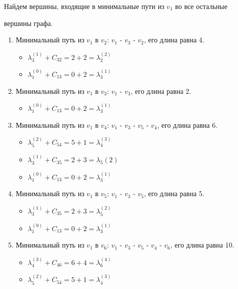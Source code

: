 \documentclass{article}
\begin{document}
\hspace{2mm}
Найдем вершины, входящие в минимальные пути из $v_1$ во все остальные
\par
\hspace{4mm}вершины графа.
\begin{enumerate} 
	\setlength{\itemindent}{6mm}
	\item Минимальный путь из $v_1$ в $v_2$: $v_1$ - $v_3$ - $v_2$, его длина равна 4.
	\begin{itemize} 
		\setlength{\itemindent}{6mm}
		\item $\lambda_3^{(1)} + C_{32} = 2 + 2 = \lambda_2^{(2)}$
        \item $\lambda_1^{(0)} + C_{13} = 0 + 2 = \lambda_3^{(1)}$
	\end{itemize} 
	\item Минимальный путь из $v_1$ в $v_3$: $v_1$ - $v_3$, его длина равна 2.
	\begin{itemize} 
		\setlength{\itemindent}{6mm}
		\item $\lambda_1^{(0)} + C_{13} = 0 + 2 = \lambda_3^{(1)}$
	\end{itemize} 
	\item Минимальный путь из $v_1$ в $v_4$: $v_1$ - $v_3$ - $v_5 $ - $v_4$, его длина равна 6.
	\begin{itemize} 
		\setlength{\itemindent}{6mm}
		\item $\lambda_5^{(2)} + C_{54} = 5 + 1 = \lambda_4^{(3)}$
        \item $\lambda_3^{(1)} + C_{35} = 2 + 3 = \lambda_5{(2)}$
        \item $\lambda_1^{(0)} + C_{13} = 0 + 2 = \lambda_3^{(1)}$
	\end{itemize} 
	\item Минимальный путь из $v_1$ в $v_5$: $v_1$ - $v_3$ - $v_5$, его длина равна 5.
	\begin{itemize} 
		\setlength{\itemindent}{6mm}
		\item $\lambda_3^{(1)} + C_{35} = 2 + 3 = \lambda_5^{(2)}$
        \item $\lambda_1^{(0)} + C_{13} = 0 + 2 = \lambda_3^{(1)}$
	\end{itemize} 
	\newpage
	\item Минимальный путь из $v_1$ в $v_6$: $v_1$ - $v_3$ - $v_5$ - $v_4$ - $v_6$, его длина равна 10.
	\begin{itemize} 
		\setlength{\itemindent}{6mm}
		\item $\lambda_4^{(3)} + C_{46} = 6 + 4 = \lambda_6^{(4)}$
        \item $\lambda_5^{(2)} + C_{54} = 5 + 1 = \lambda_4^{(3)}$

\end{itemize}
\end{enumerate}
\end{document}
